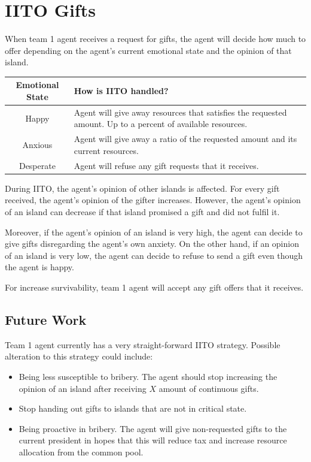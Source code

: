 \section{IITO Gifts}
When team 1 agent receives a request for gifts, the agent will decide how much to offer depending on the agent's current emotional state and the opinion of that island.

\begin{table} [htb]
    \centering
    \begin{tabular}{|c|p{}|}
        \hline
        Emotional State & How is IITO handled? \\
        \hline
        Happy & Agent will give away resources that satisfies the requested amount. Up to a percent of available resources. \\
        \hline
        Anxious & Agent will give away a ratio of the requested amount and its current resources. \\
        \hline
        Desperate & Agent will refuse any gift requests that it receives. \\
        \hline
    \end{tabular}
\end{table}

During IITO, the agent's opinion of other islands is affected. For every gift received, the agent's opinion of the gifter increases. However, the agent's opinion of an island can decrease if that island promised a gift and did not fulfil it.

Moreover, if the agent's opinion of an island is very high, the agent can decide to give gifts disregarding the agent's own anxiety. On the other hand, if an opinion of an island is very low, the agent can decide to refuse to send a gift even though the agent is happy.

For increase survivability, team 1 agent will accept any gift offers that it receives.

\subsection{Future Work}
Team 1 agent currently has a very straight-forward IITO strategy. Possible alteration to this strategy could include:
\begin{itemize}
    \item Being less susceptible to bribery. The agent should stop increasing the opinion of an island after receiving $X$ amount of continuous gifts.
    \item Stop handing out gifts to islands that are not in critical state.
    \item Being proactive in bribery. The agent will give non-requested gifts to the current president in hopes that this will reduce tax and increase resource allocation from the common pool.
\end{itemize}

